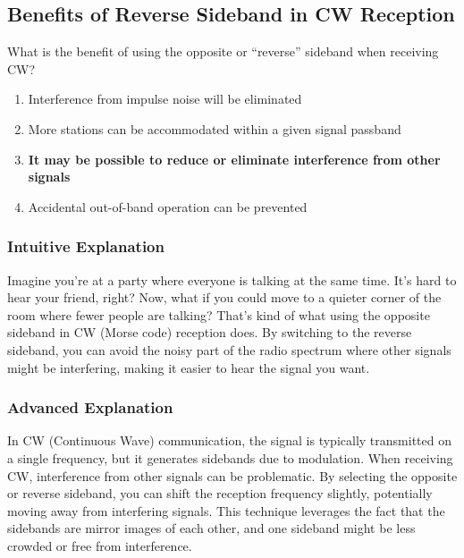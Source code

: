 \subsection{Benefits of Reverse Sideband in CW Reception}
\label{G4A02}

\begin{tcolorbox}[colback=gray!10!white,colframe=black!75!black,title=G4A02]
What is the benefit of using the opposite or “reverse” sideband when receiving CW?
\begin{enumerate}[label=\Alph*,noitemsep]
    \item Interference from impulse noise will be eliminated
    \item More stations can be accommodated within a given signal passband
    \item \textbf{It may be possible to reduce or eliminate interference from other signals}
    \item Accidental out-of-band operation can be prevented
\end{enumerate}
\end{tcolorbox}

\subsubsection*{Intuitive Explanation}
Imagine you're at a party where everyone is talking at the same time. It's hard to hear your friend, right? Now, what if you could move to a quieter corner of the room where fewer people are talking? That's kind of what using the opposite sideband in CW (Morse code) reception does. By switching to the reverse sideband, you can avoid the noisy part of the radio spectrum where other signals might be interfering, making it easier to hear the signal you want.

\subsubsection*{Advanced Explanation}
In CW (Continuous Wave) communication, the signal is typically transmitted on a single frequency, but it generates sidebands due to modulation. When receiving CW, interference from other signals can be problematic. By selecting the opposite or reverse sideband, you can shift the reception frequency slightly, potentially moving away from interfering signals. This technique leverages the fact that the sidebands are mirror images of each other, and one sideband might be less crowded or free from interference.

